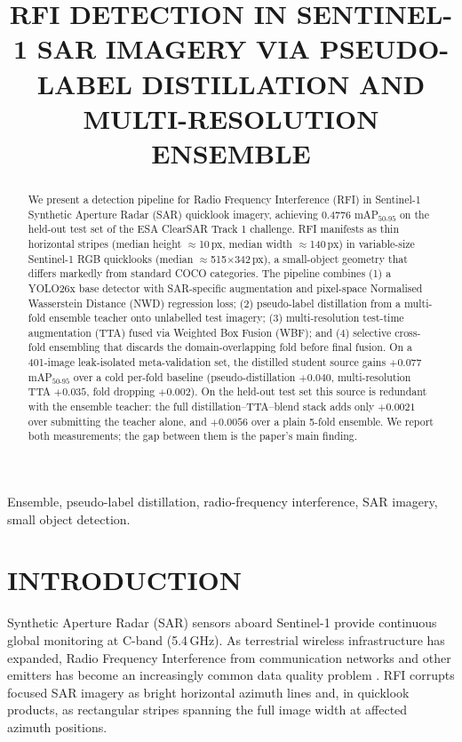 \documentclass{article}
\title{RFI DETECTION IN SENTINEL-1 SAR IMAGERY VIA PSEUDO-LABEL
DISTILLATION AND MULTI-RESOLUTION ENSEMBLE}
\begin{document}
\ninept
\maketitle

\begin{abstract}
We present a detection pipeline for Radio Frequency Interference (RFI) in
Sentinel-1 Synthetic Aperture Radar (SAR) quicklook imagery, achieving
0.4776 mAP$_{50\text{-}95}$ on the held-out test set of the ESA ClearSAR
Track 1 challenge. RFI manifests as thin horizontal stripes (median
height $\approx$10\,px, median width $\approx$140\,px) in variable-size
Sentinel-1 RGB quicklooks (median $\approx$515$\times$342\,px), a
small-object geometry that differs markedly from standard COCO
categories. The pipeline combines (1) a YOLO26x base detector with
SAR-specific augmentation and pixel-space Normalised Wasserstein
Distance (NWD) regression loss; (2) pseudo-label distillation from a
multi-fold ensemble teacher onto unlabelled test imagery; (3)
multi-resolution test-time augmentation (TTA) fused via Weighted Box
Fusion (WBF); and (4) selective cross-fold ensembling that discards
the domain-overlapping fold before final fusion. On a 401-image
leak-isolated meta-validation set, the distilled student source gains
$+0.077$ mAP$_{50\text{-}95}$ over a cold per-fold baseline
(pseudo-distillation $+0.040$, multi-resolution TTA $+0.035$, fold
dropping $+0.002$). On the held-out test set this source is redundant
with the ensemble teacher: the full distillation--TTA--blend stack adds
only $+0.0021$ over submitting the
teacher alone, and $+0.0056$ over a plain 5-fold ensemble. We report
both measurements; the gap between them is the paper's main finding.
\end{abstract}

\begin{keywords}
Ensemble, pseudo-label distillation, radio-frequency
interference, SAR imagery, small object detection.
\end{keywords}

\section{INTRODUCTION}
\label{sec:intro}

Synthetic Aperture Radar (SAR) sensors aboard Sentinel-1 provide
continuous global monitoring at C-band (5.4\,GHz). As terrestrial wireless
infrastructure has expanded, Radio Frequency Interference from
communication networks and other emitters has become an increasingly
common data quality problem \cite{njoku2005amsre}. RFI
corrupts focused SAR imagery as bright horizontal azimuth lines and, in
quicklook products, as rectangular stripes spanning the full image width
at affected azimuth positions.
\end{document}
